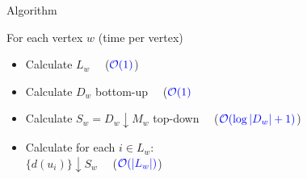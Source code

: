 \documentclass[18pt]{beamer}
\begin{document}
\begin{frame}
\end{frame}
\begin{frame}{Algorithm}
    \begin{minipage}[t]{0.49\textwidth}
    	
    	For each vertex $w$ (time per vertex)
    	\begin{itemize}
    		\item Calculate $L_w$   \ \ ($\color{blue}\mathcal{O}(1)$)
    		\item Calculate $D_w$ bottom-up \ \ ($\color{blue}\mathcal{O}(1)$
    		\item Calculate $S_w = D_w \downarrow M_w$ top-down  \ \ ($\color{blue}\mathcal{O}(\log|D_w| + 1)$)
    		\item Calculate for each $i \in L_w$: \\
    			  $\{d(u_i)\} \downarrow S_w$ \ \ ($\color{blue} \mathcal{O}(|L_w|)$)
    		

\end{itemize}
\end{minipage}
\end{frame}
\end{document}

